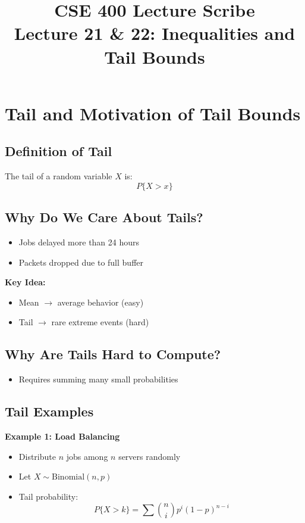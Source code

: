 \documentclass[11pt]{article}
\title{CSE 400 Lecture Scribe\\
Lecture 21 \& 22: Inequalities and Tail Bounds}
\date{}
\begin{document}
\maketitle

\section{Tail and Motivation of Tail Bounds}

\subsection{Definition of Tail}
The tail of a random variable $X$ is:
\[
P\{X > x\}
\]

\subsection{Why Do We Care About Tails?}
\begin{itemize}
\item Jobs delayed more than 24 hours
\item Packets dropped due to full buffer
\end{itemize}

\textbf{Key Idea:}
\begin{itemize}
\item Mean $\rightarrow$ average behavior (easy)
\item Tail $\rightarrow$ rare extreme events (hard)
\end{itemize}

\subsection{Why Are Tails Hard to Compute?}
\begin{itemize}
\item Requires summing many small probabilities
\end{itemize}

\subsection{Tail Examples}

\textbf{Example 1: Load Balancing}
\begin{itemize}
\item Distribute $n$ jobs among $n$ servers randomly
\item Let $X \sim \text{Binomial}(n,p)$
\item Tail probability:
\[
P\{X > k\} = \sum \binom{n}{i} p^i (1-p)^{n-i}
\]
\end{itemize}
\end{document}
